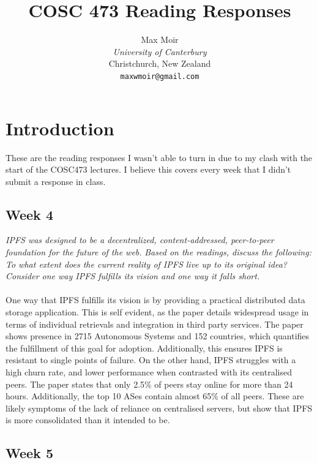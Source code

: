\documentclass{article}
\title{COSC 473 Reading Responses}
\author{
    Max Moir \\
    \textit{University of Canterbury} \\ 
    Christchurch, New Zealand \\ 
    \texttt{maxwmoir@gmail.com}
}
\theoremstyle{definition}
\begin{document}
\maketitle

\section{Introduction}

These are the reading responses I wasn't able to turn in due to my clash with the start of the COSC473 lectures.
I believe this covers every week that I didn't submit a response in class.

\subsection{Week 4}

\textit{IPFS was designed to be a decentralized, content-addressed, peer-to-peer foundation for the future of the web.}
\textit{Based on the readings, discuss the following:}
\textit{To what extent does the current reality of IPFS live up to its original idea?}
\textit{Consider one way IPFS fulfills its vision and one way it falls short.}
\\
\\
\noindent
One way that IPFS fulfills its vision is by providing a practical distributed data storage 
application.
This is self evident, as the paper details widespread usage in terms of individual retrievals and 
integration in third party services.
The paper shows presence in 2715 Autonomous Systems and 152 countries, 
which quantifies the fulfillment of this goal for adoption.
Additionally, this ensures IPFS is resistant to single points of failure.
On the other hand, IPFS struggles with a high churn rate, and lower performance when contrasted with 
its centralised peers. The paper states that only 2.5\% of peers stay online for more than 24 hours. 
Additionally, the top 10 ASes contain almost 65\% of all peers.
These are likely symptoms of the lack of reliance on centralised servers, 
but show that IPFS is more consolidated than it intended to be.

\subsection{Week 5}
\end{document}
